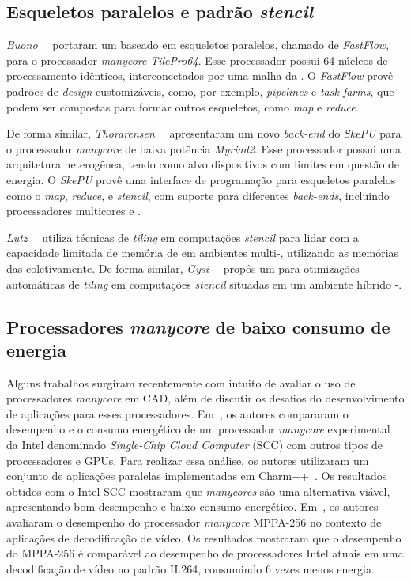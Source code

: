 
\subsection{Esqueletos paralelos e padrão \textit{stencil}}
\emph{Buono}~\etal~\cite{buono13} portaram um \fw baseado em esqueletos paralelos,
chamado de \emph{FastFlow}, para o processador \textit{manycore} \emph{TilePro64}.
Esse processador possui 64 núcleos de processamento idênticos, interconectados
por uma malha da \noc. O \fw \emph{FastFlow} provê padrões de \textit{design}
customizáveis, como, por exemplo, \textit{pipelines} e \textit{task farms},
que podem ser compostas para formar outros esqueletos, como \textit{map} e
\textit{reduce}.

De forma similar, \emph{Thorarensen}~\etal~\cite{thoraransen16} apresentaram um
novo \textit{back-end} do \fw \emph{SkePU} para o processador \textit{manycore}
de baixa potência \emph{Myriad2}. Esse processador possui uma arquitetura
heterogênea, tendo como alvo dispositivos com limites em questão de energia.
O \fw \emph{SkePU} provê uma interface de programação para esqueletos paralelos
como o \textit{map}, \textit{reduce}, e \textit{stencil}, com suporte para
diferentes \textit{back-ends}, incluindo processadores multicores e \gpus.

\emph{Lutz}~\etal~\cite{lutz13} utiliza técnicas de \textit{tiling} em
computações \textit{stencil} para lidar com a capacidade limitada de memória
de \gpus em ambientes multi-\gpu, utilizando as memórias das \gpus
coletivamente. De forma similar, \emph{Gysi}~\etal~\cite{gysi15} propôs um \fw
para otimizações automáticas de \textit{tiling} em computações \textit{stencil}
situadas em um ambiente híbrido \cpu{}-\gpu.


\subsection{Processadores \textit{manycore} de baixo consumo de energia}
Alguns trabalhos surgiram recentemente com intuito de avaliar o uso de
processadores \emph{manycore} em CAD, além de discutir os desafios do
desenvolvimento de aplicações para esses processadores.
Em~\cite{SCCEnergy:2012}, os autores compararam o desempenho e o consumo
energético de um processador \emph{manycore} experimental da Intel denominado
\emph{Single-Chip Cloud Computer} (SCC) com outros tipos de processadores e
GPUs. Para realizar essa análise, os autores utilizaram um conjunto de
aplicações paralelas implementadas em Charm++~\cite{Charm:2012}. Os resultados
obtidos com o Intel SCC mostraram que \emph{manycores} são uma alternativa
viável, apresentando bom desempenho e baixo consumo energético.
Em~\cite{MPPA-1:2013}, os autores avaliaram o desempenho do processador
\emph{manycore} MPPA-256 no contexto de aplicações de decodificação de vídeo. Os
resultados mostraram que o desempenho do MPPA-256 é comparável ao desempenho de
processadores Intel atuais em uma decodificação de vídeo no padrão H.264,
consumindo 6 vezes menos energia.

